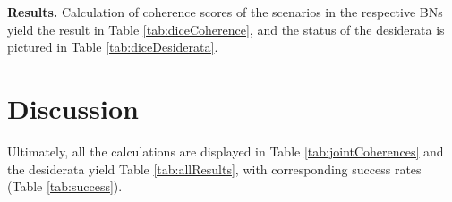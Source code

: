 \documentclass[
  10pt,
]{scrartcl}
\begin{document}
\textbf{Results.} Calculation of coherence scores of the scenarios in the respective BNs yield the result in Table \ref{tab:diceCoherence}, and the status of the desiderata is pictured in Table \ref{tab:diceDesiderata}.

\begin{table}[H]

\caption{\label{tab:diceCoherence}Coherence scores in the dice problem (rounded).}
\centering
{}
\end{table}

\begin{table}[H]

\caption{\label{tab:diceDesiderata}Desideratum satisfaction in the dice problem.}
\centering
{}
\end{table}

\hypertarget{discussion}{%
\section{Discussion}\label{discussion}}

Ultimately, all the calculations are displayed in Table \ref{tab:jointCoherences} and the desiderata yield Table \ref{tab:allResults}, with corresponding success rates (Table \ref{tab:success}).
\end{document}
